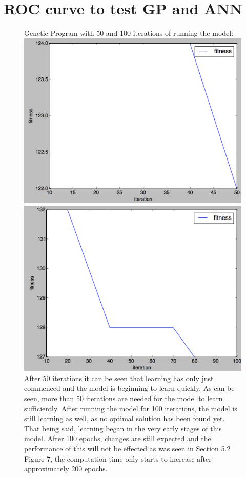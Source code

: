 \documentclass[11pt]{article}
\begin{document}
\section{ROC curve to test GP and ANN}
\begin{figure}[h]
\centering
Genetic Program with 50 and 100 iterations of running the model:
\includegraphics[scale = .35]{learn1}
\includegraphics[scale = .35]{learn2}
After 50 iterations it can be seen that learning has only just commenced and the model is beginning to learn quickly. As can be seen, more than 50 iterations are needed for the model to learn sufficiently. After running the model for 100 iterations, the model is still learning as well, as no optimal solution has been found yet. That being said, learning began in the very early stages of this model. After 100 epochs, changes are still expected and the performance of this will not be effected as was seen in Section 5.2 Figure 7, the computation time only starts to increase after approximately 200 epochs.
\end{figure}
\end{document}
